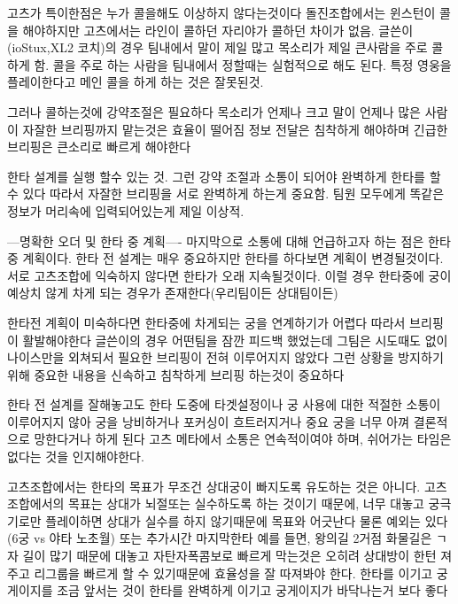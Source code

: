 고츠가 특이한점은 누가 콜을해도 이상하지 않다는것이다
돌진조합에서는 윈스턴이 콜을 해야하지만 고츠에서는 라인이 콜하던 자리야가 콜하던 차이가 없음.
글쓴이(ioStux,XL2 코치)의 경우 팀내에서 말이 제일 많고 목소리가 제일 큰사람을 주로 콜 하게 함.
콜을 주로 하는 사람을 팀내에서 정할때는 실험적으로 해도 된다.
특정 영웅을 플레이한다고 메인 콜을 하게 하는 것은 잘못된것.

그러나 콜하는것에 강약조절은 필요하다
목소리가 언제나 크고 말이 언제나 많은 사람이 자잘한 브리핑까지 맡는것은 효율이 떨어짐
정보 전달은 침착하게 해야하며 긴급한 브리핑은 큰소리로 빠르게 해야한다

한타 설계를 실행 할수 있는 것. 그런 강약 조절과 소통이 되어야 완벽하게 한타를 할 수 있다
따라서 자잘한 브리핑을 서로 완벽하게 하는게 중요함. 팀원 모두에게 똑같은 정보가 머리속에 입력되어있는게 제일 이상적.

---명확한 오더 및 한타 중 계획----
마지막으로 소통에 대해 언급하고자 하는 점은 한타 중 계획이다.
한타 전 설계는 매우 중요하지만 한타를 하다보면 계획이 변경될것이다.
서로 고츠조합에 익숙하지 않다면 한타가 오래 지속될것이다.
이럴 경우 한타중에 궁이 예상치 않게 차게 되는 경우가 존재한다(우리팀이든 상대팀이든)

한타전 계획이 미숙하다면 한타중에 차게되는 궁을 연계하기가 어렵다
따라서 브리핑이 활발해야한다
글쓴이의 경우 어떤팀을 잠깐 피드백 했었는데 
그팀은 시도때도 없이 나이스만을 외쳐되서 필요한 브리핑이 전혀 이루어지지 않았다
그런 상황을 방지하기 위해 중요한 내용을 신속하고 침착하게 브리핑 하는것이 중요하다

한타 전 설계를 잘해놓고도 한타 도중에 타겟설정이나 궁 사용에 대한 적절한 소통이 이루어지지 않아
궁을 낭비하거나 포커싱이 흐트러지거나 중요 궁을 너무 아껴 결론적으로 망한다거나 하게 된다
고츠 메타에서 소통은 연속적이여야 하며, 쉬어가는 타임은 없다는 것을 인지해야한다.

고츠조합에서는 한타의 목표가 무조건 상대궁이 빠지도록 유도하는 것은 아니다.
고츠조합에서의 목표는 상대가 뇌절또는 실수하도록 하는 것이기 때문에, 너무 대놓고 궁극기로만 플레이하면 상대가 실수를 하지 않기때문에 목표와 어긋난다
물론 예외는 있다 (6궁 vs 야타 노초월)
또는 추가시간 마지막한타
예를 들면, 왕의길 2거점 화물길은 ㄱ자 길이 많기 때문에 대놓고 자탄자폭콤보로 빠르게 막는것은 오히려 상대방이 한턴 져주고 
리그룹을 빠르게 할 수 있기때문에 효율성을 잘 따져봐야 한다.
한타를 이기고 궁 게이지를 조금 앞서는 것이 한타를 완벽하게 이기고 궁게이지가 바닥나는거 보다 좋다

